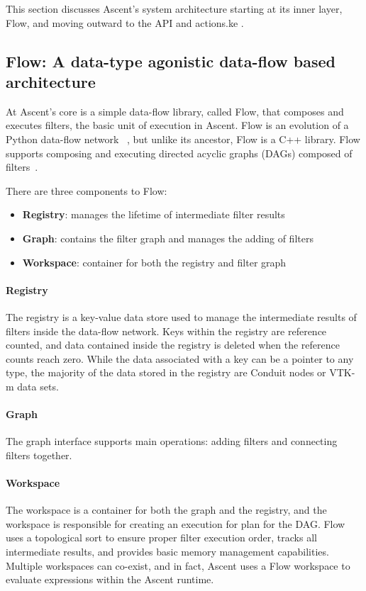 This section discusses Ascent's system architecture starting at its inner layer, Flow,
and moving outward to the API and actions.ke .

\subsection{Flow: A data-type agonistic data-flow based architecture}
At Ascent's core is a simple data-flow library, called Flow, that
composes and executes filters, the basic unit of execution in Ascent.
%
Flow is an evolution of a Python data-flow network
~\cite{flow_reference}, but unlike its ancestor, Flow is a C++
library.
%
Flow supports composing and executing directed acyclic graphs
(DAGs) composed of filters~\cite{LarsenAscent}.

There are three components to Flow:
\begin{itemize}
  \item \textbf{Registry}: manages the lifetime of intermediate filter results
  \item \textbf{Graph}: contains the filter graph and manages the adding of filters
  \item \textbf{Workspace}: container for both the registry and filter graph
\end{itemize}

\paragraph{Registry}
The registry is a key-value data store used to manage the intermediate
results of filters inside the data-flow network.
%
Keys within the registry are reference counted, and data contained
inside the registry is deleted when the reference counts reach zero.
%
While the data associated with a key can be a pointer to any type,
the majority of the data stored in the registry are Conduit nodes
or VTK-m data sets.

\paragraph{Graph}
The graph interface supports main operations: adding filters
and connecting filters together.
%

\paragraph{Workspace}
The workspace is a container for both the graph and the registry,
and the workspace is responsible for creating an execution for plan
for the DAG.
%
Flow uses a topological sort to ensure proper filter execution order,
tracks all intermediate results, and provides basic memory management capabilities.
%
Multiple workspaces can co-exist, and in fact, Ascent uses a Flow workspace
to evaluate expressions within the Ascent runtime.

